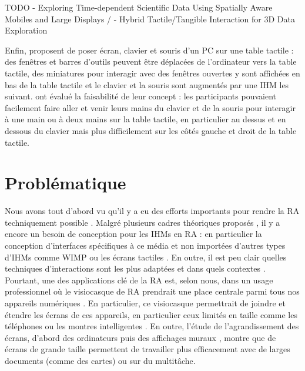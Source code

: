 
TODO \cite{Sollich2016} - Exploring Time-dependent Scientific Data Using Spatially Aware Mobiles and Large Displays /
\cite{Besancon2017} - Hybrid Tactile/Tangible Interaction for 3D Data Exploration

Enfin, \cite{Bi2011} proposent de poser écran, clavier et souris d'un PC sur une table tactile  : des fenêtres et barres d'outils peuvent être déplacées de l'ordinateur vers la table tactile, des miniatures pour interagir avec des fenêtres ouvertes y sont affichées en bas de la table tactile et le clavier et la souris sont augmentés par une IHM les suivant. \citeauthor{Bi2011} ont évalué la faisabilité de leur concept : les participants pouvaient facilement faire aller et venir leurs mains du clavier et de la souris pour interagir à une main ou à deux mains sur la table tactile, en particulier au dessus et en dessous du clavier mais plus difficilement sur les côtés gauche et droit de la table tactile.



\section{Problématique}
\label{sec:research_problem}

Nous avons tout d'abord vu qu'il y a eu des efforts importants pour rendre la RA techniquement possible \citep{Azuma2001, VanKrevelen2010}. Malgré plusieurs cadres théoriques proposés \citep{Milgram1994, Rekimoto1995, Bimber2005, Ens2014a}, il y a encore un besoin de conception pour les IHMs en RA \citep{Billinghurst2015} : en particulier la conception d'interfaces spécifiques à ce média et non importées d'autres types d'IHMs comme WIMP ou les écrans tactiles \citep{VanDam1997, Billinghurst2005}. En outre, il est peu clair quelles techniques d'interactions sont les plus adaptées et dans quels contextes \citep{Argelaguet2013, Piumsomboon2013, Piumsomboon2014}. Pourtant, une des applications clé de la RA est, selon nous, dans un usage professionnel où le visiocasque de RA prendrait une place centrale parmi tous nos appareils numériques \citep{Rekimoto1995, Serrano2015}. En particulier, ce visiocasque permettrait de joindre et étendre les écrans de ces appareils, en particulier ceux limités en taille comme les téléphones ou les montres intelligentes \cite{Grubert2015}. En outre, l'étude de l'agrandissement des écrans, d'abord des ordinateurs \cite{Baudisch2002, Guiard2004} puis des affichages muraux \cite{Liu2014, Raedle2014}, montre que de écrans de grande taille permettent de travailler plus efficacement avec de larges documents (comme des cartes) ou sur du multitâche.

